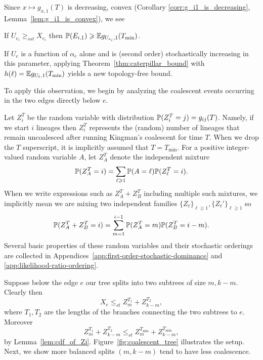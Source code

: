 Since $x \mapsto g_{x,1}(T)$ is decreasing, convex (Corollary \ref{corr:g_i1_is_decreasing},
 Lemma~\ref{lem:g_i1_is_convex}), we see
\begin{lemma}
\label{lem:bounding_prob_with_second_order_stochastic_dominance}
If $U_{e_i} \geq_{sst} X_{e_i}$ then $\P(E_{i,1}) \geq \E g_{U_{e_i}, 1}(T_{\mathrm{min}})$.
\end{lemma}

\begin{remark}
    If $U_e$ is a function of $\alpha_e$ alone and is (second order) stochastically increasing in this parameter,
    applying Theorem~\ref{thm:caterpillar_bound} with $h(\ell) = \E g_{U_\ell, 1}(T_{\mathrm{min}})$ yields
    a new topology-free bound.
\end{remark}

 To apply this observation, we begin by analyzing the coalescent events
occurring in the two edges directly below $e$.

Let $Z_i^T$ be the random variable with distribution
 $\P(Z_i^T = j) = g_{ij}(T)$. Namely, if we start $i$ lineages then $Z_i^T$ represents the (random)
 number of lineages that remain uncoalesced after running Kingman's coalescent
 for time $T$. When we drop the $T$ superscript, it is implicitly assumed that $T = T_{\mathrm{min}}$.
 For a positive integer-valued random variable $A$, let $Z_A^T$ denote the independent mixture
    \[\P(Z_A^T = i) = \sum_{\ell \geq 1} \P(A = \ell) \P(Z_\ell^T = i).\]
 \noindent When we write expressions such as $Z_A^T + Z_B^T$ including multiple such mixtures,
 we implicitly mean we are mixing two independent families $\{Z_\ell\}_{\ell \geq 1}, \{Z_\ell'\}_{\ell\geq 1}$ so
    \[\P(Z_A^T + Z_B^T = i) = \sum_{m=1}^{i-1} \P(Z_A^T = m) \P(Z_B^T = i-m).\]
\noindent Several basic properties of these random variables and their stochastic orderings are collected
in Appendices~\ref{app:first-order-stochastic-dominance} and \ref{app:likelihood-ratio-ordering}.

Suppose below the edge $e$ our tree splits into two subtrees of size $m, k-m$. Clearly then
%
\[X_e \leq_{st}  Z_{m}^{T_1} + Z_{k-m}^{T_2},\]
%
\noindent where $T_1, T_2$ are the lengths of the branches connecting the two subtrees
to $e$.  Moreover
%
    \[Z_{m}^{T_1} + Z_{k-m}^{T_2} \leq_{st} Z_m^{T_{\mathrm{min}}} + Z_{k-m}^{T_{\mathrm{min}}},\]
%
\noindent by Lemma~\ref{lem:cdf_of_Zi}. Figure~\ref{fig:coalescent_tree} illustrates the setup. Next,
we show more balanced splits $(m, k-m)$ tend to have less coalescence.

